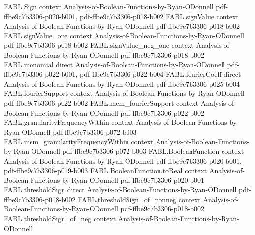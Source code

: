 \begin{theorem}
\label{FABL.laplacian_toReal_eq_mul_sensitivity}
\leanok
{}
\proofstep
  {FABL.Sign}
  {context}
  {Analysis-of-Boolean-Functions-by-Ryan-ODonnell}
  {pdf-ffbe9c7b3306-p020-b001,
    pdf-ffbe9c7b3306-p018-b002}
\proofstep
  {FABL.signValue}
  {context}
  {Analysis-of-Boolean-Functions-by-Ryan-ODonnell}
  {pdf-ffbe9c7b3306-p018-b002}
\proofstep
  {FABL.signValue_one}
  {context}
  {Analysis-of-Boolean-Functions-by-Ryan-ODonnell}
  {pdf-ffbe9c7b3306-p018-b002}
\proofstep
  {FABL.signValue_neg_one}
  {context}
  {Analysis-of-Boolean-Functions-by-Ryan-ODonnell}
  {pdf-ffbe9c7b3306-p018-b002}
\proofstep
  {FABL.monomial}
  {direct}
  {Analysis-of-Boolean-Functions-by-Ryan-ODonnell}
  {pdf-ffbe9c7b3306-p022-b001,
    pdf-ffbe9c7b3306-p022-b004}
\proofstep
  {FABL.fourierCoeff}
  {direct}
  {Analysis-of-Boolean-Functions-by-Ryan-ODonnell}
  {pdf-ffbe9c7b3306-p025-b004}
\proofstep
  {FABL.fourierSupport}
  {context}
  {Analysis-of-Boolean-Functions-by-Ryan-ODonnell}
  {pdf-ffbe9c7b3306-p022-b002}
\proofstep
  {FABL.mem_fourierSupport}
  {context}
  {Analysis-of-Boolean-Functions-by-Ryan-ODonnell}
  {pdf-ffbe9c7b3306-p022-b002}
\proofstep
  {FABL.granularityFrequencyWithin}
  {context}
  {Analysis-of-Boolean-Functions-by-Ryan-ODonnell}
  {pdf-ffbe9c7b3306-p072-b003}
\proofstep
  {FABL.mem_granularityFrequencyWithin}
  {context}
  {Analysis-of-Boolean-Functions-by-Ryan-ODonnell}
  {pdf-ffbe9c7b3306-p072-b003}
\proofstep
  {FABL.BooleanFunction}
  {context}
  {Analysis-of-Boolean-Functions-by-Ryan-ODonnell}
  {pdf-ffbe9c7b3306-p020-b001,
    pdf-ffbe9c7b3306-p019-b003}
\proofstep
  {FABL.BooleanFunction.toReal}
  {context}
  {Analysis-of-Boolean-Functions-by-Ryan-ODonnell}
  {pdf-ffbe9c7b3306-p020-b001}
\proofstep
  {FABL.thresholdSign}
  {direct}
  {Analysis-of-Boolean-Functions-by-Ryan-ODonnell}
  {pdf-ffbe9c7b3306-p018-b002}
\proofstep
  {FABL.thresholdSign_of_nonneg}
  {context}
  {Analysis-of-Boolean-Functions-by-Ryan-ODonnell}
  {pdf-ffbe9c7b3306-p018-b002}
\proofstep
  {FABL.thresholdSign_of_neg}
  {context}
  {Analysis-of-Boolean-Functions-by-Ryan-ODonnell}

\end{theorem}
